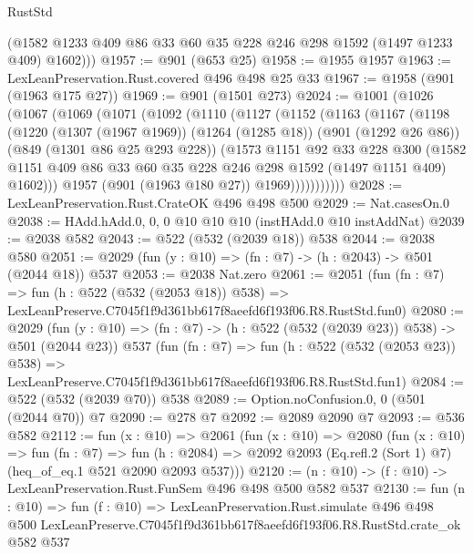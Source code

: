 \begin{lexlean}{RustStd}
\begin{coremodule}
        (@1582 @1233 @409 @86 @33 @60 @35 @228 @246 @298 @1592 (@1497 @1233 @409) @1602)))
@1957 := @901 (@653 @25)
@1958 := @1955 @1957
@1963 := LexLeanPreservation.Rust.covered @496 @498 @25 @33
@1967 := @1958 (@901 (@1963 @175 @27))
@1969 := @901 (@1501 @273)
@2024 := @1001
    (@1026
      (@1067
        (@1069
          (@1071
            (@1092
              (@1110
                (@1127
                  (@1152
                    (@1163
                      (@1167
                        (@1198
                          (@1220
                            (@1307 (@1967 @1969))
                            (@1264 (@1285 @18))
                            (@901 (@1292 @26 @86))
                            (@849 (@1301 @86 @25 @293 @228))
                            (@1573
                              @1151
                              @92
                              @33
                              @228
                              @300
                              (@1582
                                @1151
                                @409
                                @86
                                @33
                                @60
                                @35
                                @228
                                @246
                                @298
                                @1592
                                (@1497 @1151 @409)
                                @1602)))
                          @1957
                          (@901 (@1963 @180 @27))
                          @1969)))))))))))
@2028 := LexLeanPreservation.Rust.CrateOK @496 @498 @500
@2029 := Nat.casesOn.{0}
@2038 := HAdd.hAdd.{0, 0, 0} @10 @10 @10 (instHAdd.{0} @10 instAddNat)
@2039 := @2038 @582
@2043 := @522 (@532 (@2039 @18)) @538
@2044 := @2038 @580
@2051 := @2029 (fun (y : @10) => (fn : @7) -> (h : @2043) -> @501 (@2044 @18)) @537
@2053 := @2038 Nat.zero
@2061 := @2051
    (fun (fn : @7) =>
    fun (h : @522 (@532 (@2053 @18)) @538) =>
    LexLeanPreserve.C7045f1f9d361bb617f8aeefd6f193f06.R8.RustStd.fun0)
@2080 := @2029
    (fun (y : @10) => (fn : @7) -> (h : @522 (@532 (@2039 @23)) @538) -> @501 (@2044 @23))
    @537
    (fun (fn : @7) =>
    fun (h : @522 (@532 (@2053 @23)) @538) =>
    LexLeanPreserve.C7045f1f9d361bb617f8aeefd6f193f06.R8.RustStd.fun1)
@2084 := @522 (@532 (@2039 @70)) @538
@2089 := Option.noConfusion.{0, 0} (@501 (@2044 @70)) @7
@2090 := @278 @7
@2092 := @2089 @2090 @7
@2093 := @536 @582
@2112 := fun (x : @10) =>
  @2061
    (fun (x : @10) =>
    @2080
      (fun (x : @10) =>
      fun (fn : @7) =>
      fun (h : @2084) =>
      @2092 @2093 (Eq.refl.{2} (Sort 1) @7) (heq_of_eq.{1} @521 @2090 @2093 @537)))
@2120 := (n : @10) -> (f : @10) -> LexLeanPreservation.Rust.FunSem @496 @498 @500 @582 @537
@2130 := fun (n : @10) =>
  fun (f : @10) =>
  LexLeanPreservation.Rust.simulate
    @496
    @498
    @500
    LexLeanPreserve.C7045f1f9d361bb617f8aeefd6f193f06.R8.RustStd.crate_ok
    @582
    @537
\end{coremodule}
\end{lexlean}
